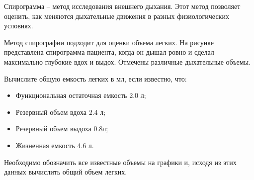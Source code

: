 
Спирограмма – метод исследования внешнего дыхания. Этот
метод позволяет оценить, как меняются дыхательные движения в разных
физиологических условиях. 

Метод спирографии подходит для
оценки объема легких. На рисунке представлена спирограмма пациента, когда он
дышал ровно и сделал максимально глубокие вдох и выдох. Отмечены различные
дыхательные объемы.


Вычислите общую емкость легких в мл, если известно, что:

\begin{itemize}
    \item Функциональная остаточная емкость 2.0 л;
    \item Резервный объем вдоха 2.4 л;
    \item Резервный объем выдоха 0.8л;
    \item Жизненная емкость 4.6 л.
\end{itemize}

\explanationSection

Необходимо обозначить все известные объемы на графики и, исходя из этих данных вычислить общий объем легких.

